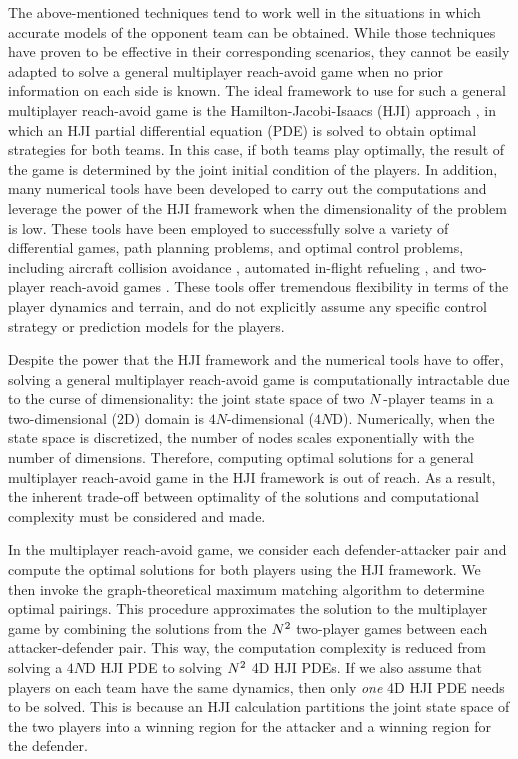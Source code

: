 The above-mentioned techniques tend to work well in the situations in which accurate models of the opponent team can be obtained. While those techniques have proven to be effective in their corresponding scenarios, they cannot be easily adapted to solve a general multiplayer reach-avoid game when no prior information on each side is known. The ideal framework to use for such a general multiplayer reach-avoid game is the Hamilton-Jacobi-Isaacs (HJI) approach \cite{b:isaacs-1967}, in which an HJI partial differential equation (PDE) is solved to obtain optimal strategies for both teams. In this case, if both teams play optimally, the result of the game is determined by the joint initial condition of the players. In addition, many numerical tools \cite{j:mitchell-TAC-2005, Sethian1996, b:osher-fedkiw-2002} have been developed to carry out the computations and leverage the power of the HJI framework when the dimensionality of the problem is low. These  tools have been employed to successfully solve a variety of differential games, path planning problems, and optimal control problems, including aircraft collision avoidance \cite{j:mitchell-TAC-2005}, automated in-flight refueling \cite{DSST08}, and two-player reach-avoid games \cite{Huang2011}. These tools offer tremendous flexibility in terms of the player dynamics and terrain, and do not explicitly assume any specific control strategy or prediction models for the players. 

Despite the power that the HJI framework and the numerical tools have to offer, solving a general multiplayer reach-avoid game is computationally intractable due to the curse of dimensionality: the joint state space of two $N$-player teams in a two-dimensional (2D) domain is $4N$-dimensional ($4N$D). Numerically, when the state space is discretized, the number of nodes scales exponentially with the number of dimensions. Therefore, computing optimal solutions for a general multiplayer reach-avoid game in the HJI framework is out of reach. As a result, the inherent trade-off between optimality of the solutions and computational complexity must be considered and made. 

In the multiplayer reach-avoid game, we consider each defender-attacker pair and compute the optimal solutions for both players using the HJI framework. We then invoke the graph-theoretical maximum matching algorithm  \cite{Schrjiver2004, Karpinski1998} to determine optimal pairings. This procedure approximates the solution to the multiplayer game by combining the solutions from the $N^2$ two-player games between each attacker-defender pair. This way, the computation complexity is reduced from solving a $4N$D HJI PDE to solving $N^2$ 4D HJI PDEs. If we also assume that players on each team have the same dynamics, then only \textit{one} 4D HJI PDE needs to be solved. This is because an HJI calculation partitions the joint state space of the two players into a winning region for the attacker and a winning region for the defender. 

